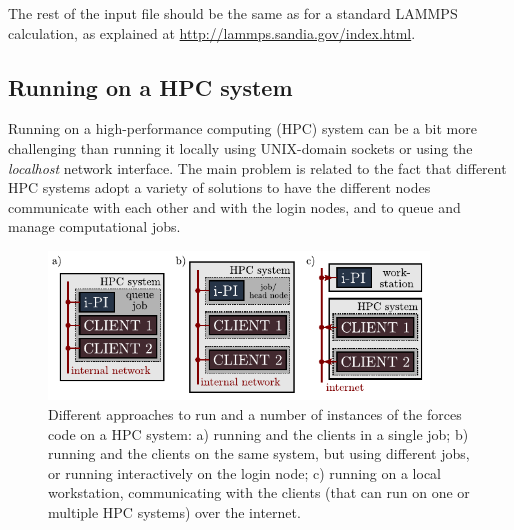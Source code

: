 \documentclass[11pt,english,fleqn]{report}
\begin{document}
The rest of the input file should be the same as for a standard LAMMPS 
calculation, as explained at \url{http://lammps.sandia.gov/index.html}.

\subsection{Running on a HPC system}\label{hpc}

Running \ipi on a high-performance computing (HPC) system can be a bit more challenging
than running it locally using UNIX-domain sockets or using the \emph{localhost} 
network interface.
The main problem is related to the fact that different HPC systems adopt
a variety of solutions to have the different nodes communicate with each other
and with the login nodes, and to queue and manage computational jobs. 
 
\begin{figure}[hbt]
\centering\includegraphics[width=0.9\textwidth]{figures/ipi-running.pdf}
\caption{\label{fig:running} Different approaches to run \ipi and a number of 
instances of the forces code on a HPC system: a) running \ipi and the clients in a single
job; b) running \ipi and the clients on the same system, but using different jobs, or running
\ipi interactively on the login node; c) running \ipi on a local workstation, communicating
with the clients (that can run on one or multiple HPC systems) over the internet. } 
\end{figure}
\end{document}
